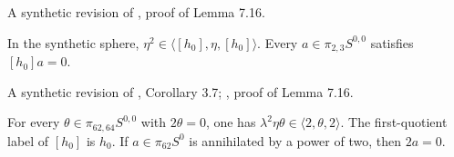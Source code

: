 \begin{theorem}
\label{frontier:Literature:dd011cab6d38}
A synthetic revision of \cite{LWX126}, proof of Lemma 7.16.\par

In the synthetic sphere, $\eta^2\in\langle[h_0],\eta,[h_0]\rangle$. Every $a\in\pi_{2,3}S^{0,0}$ satisfies $[h_0]a=0$.

A synthetic revision of \cite{Toda1962}, Corollary 3.7; \cite{LWX126}, proof of Lemma 7.16.\par

For every $\theta\in\pi_{62,64}S^{0,0}$ with $2\theta=0$, one has $\lambda^2\eta\theta\in\langle2,\theta,2\rangle$. The first-quotient label of $[h_0]$ is $h_0$. If $a\in\pi_{62}S^0$ is annihilated by a power of two, then $2a=0$.

\end{theorem}
